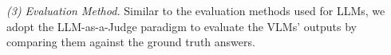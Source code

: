 \textit{(3) Evaluation Method.} Similar to the evaluation methods used for LLMs, we adopt the LLM-as-a-Judge paradigm to evaluate the VLMs' outputs by comparing them against the ground truth answers.










